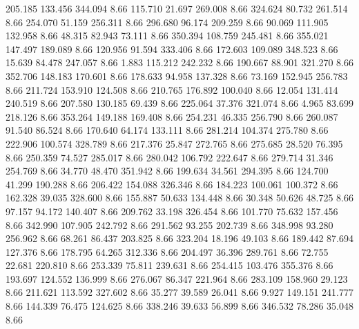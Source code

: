  205.185  133.456  344.094         8.66
 115.710   21.697  269.008         8.66
 324.624   80.732  261.514         8.66
 254.070   51.159  256.311         8.66
 296.680   96.174  209.259         8.66
  90.069  111.905  132.958         8.66
  48.315   82.943   73.111         8.66
 350.394  108.759  245.481         8.66
 355.021  147.497  189.089         8.66
 120.956   91.594  333.406         8.66
 172.603  109.089  348.523         8.66
  15.639   84.478  247.057         8.66
   1.883  115.212  242.232         8.66
 190.667   88.901  321.270         8.66
 352.706  148.183  170.601         8.66
 178.633   94.958  137.328         8.66
  73.169  152.945  256.783         8.66
 211.724  153.910  124.508         8.66
 210.765  176.892  100.040         8.66
  12.054  131.414  240.519         8.66
 207.580  130.185   69.439         8.66
 225.064   37.376  321.074         8.66
   4.965   83.699  218.126         8.66
 353.264  149.188  169.408         8.66
 254.231   46.335  256.790         8.66
 260.087   91.540   86.524         8.66
 170.640   64.174  133.111         8.66
 281.214  104.374  275.780         8.66
 222.906  100.574  328.789         8.66
 217.376   25.847  272.765         8.66
 275.685   28.520   76.395         8.66
 250.359   74.527  285.017         8.66
 280.042  106.792  222.647         8.66
 279.714   31.346  254.769         8.66
  34.770   48.470  351.942         8.66
 199.634   34.561  294.395         8.66
 124.700   41.299  190.288         8.66
 206.422  154.088  326.346         8.66
 184.223  100.061  100.372         8.66
 162.328   39.035  328.600         8.66
 155.887   50.633  134.448         8.66
  30.348   50.626   48.725         8.66
  97.157   94.172  140.407         8.66
 209.762   33.198  326.454         8.66
 101.770   75.632  157.456         8.66
 342.990  107.905  242.792         8.66
 291.562   93.255  202.739         8.66
 348.998   93.280  256.962         8.66
  68.261   86.437  203.825         8.66
 323.204   18.196   49.103         8.66
 189.442   87.694  127.376         8.66
 178.795   64.265  312.336         8.66
 204.497   36.396  289.761         8.66
  72.755   22.681  220.810         8.66
 253.339   75.811  239.631         8.66
 254.415  103.476  355.376         8.66
 193.697  124.552  136.999         8.66
 276.067   86.347  221.964         8.66
 283.109  158.960   29.123         8.66
 211.621  113.592  327.602         8.66
  35.277   39.589   26.041         8.66
   9.927  149.151  241.777         8.66
 144.339   76.475  124.625         8.66
 338.246   39.633   56.899         8.66
 346.532   78.286   35.048         8.66
